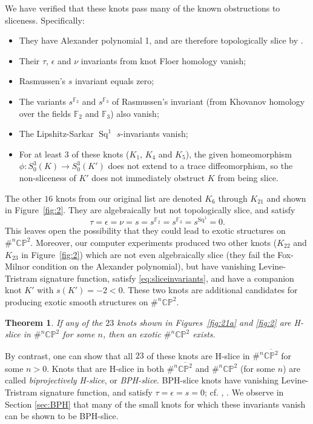 \documentclass [11pt]{amsart}
\newtheorem {theorem}{Theorem}[section]
\theoremstyle{remark}
\def\CP{\mathbb{CP}^2}
\def\bCP{\overline{\mathbb{CP}^2}}
\def\F{\mathbb{F}}
\begin{document}
We have verified that these knots pass many of the known obstructions to sliceness. Specifically:
\begin{itemize}
\item They have Alexander polynomial 1, and are therefore topologically slice by \cite{Freedman}. 
\item Their $\tau$, $\epsilon$ and $\nu$ invariants from knot Floer homology vanish;
\item Rasmussen's $s$ invariant equals zero;
\item The variants $s^{\F_2}$ and $s^{\F_3}$ of Rasmussen's invariant (from Khovanov homology over the fields $\F_2$ and $\F_3$) also vanish;
\item The Lipshitz-Sarkar $\operatorname{Sq}^1$ $s$-invariants vanish;
\item For at least $3$ of these knots ($K_1$, $K_4$ and $K_5$), the given homeomorphism $\phi: S^3_0(K) \to S^3_0(K')$ does not extend to a trace diffeomorphism, so the non-sliceness of $K'$ does not immediately obstruct $K$ from being slice. 
\end{itemize}

The other $16$ knots from our original list are denoted $K_6$ through $K_{21}$ and shown in Figure~\ref{fig:2}. They are algebraically but not topologically slice, and satisfy
\begin{equation}
\label{eq:sliceinvariants}
\tau=\epsilon=\nu=s=s^{\F_2}=s^{\F_3}=s^{\operatorname{Sq}^1} =0.
\end{equation}
This leaves open the possibility that they could lead to exotic structures on $\#^n \CP$. Moreover, our computer experiments produced two other knots ($K_{22}$ and $K_{23}$ in Figure~\ref{fig:2}) which are not even algebraically slice (they fail the Fox-Milnor condition on the Alexander polynomial), but have vanishing Levine-Tristram signature function, satisfy \eqref{eq:sliceinvariants}, and have a companion knot $K'$ with $s(K')=-2< 0$. These two knots are additional candidates for producing exotic smooth structures on $\#^n \CP$. 

\begin{theorem}
\label{thm:23}
If any of the $23$ knots shown in Figures~\ref{fig:21a} and \ref{fig:2} are H-slice in $\#^n \CP$ for some $n$, then an exotic $\#^n \CP$ exists.
\end{theorem}

By contrast, one can show that all $23$ of these knots are H-slice in $\#^n \bCP$ for some $n > 0$. Knots that are H-slice in both $\#^n \bCP$ and $\#^n \CP$ (for some $n$) are called \emph{biprojectively H-slice}, or \emph{BPH-slice}. BPH-slice knots have vanishing Levine-Tristram signature function, and satisfy $\tau=\epsilon=s=0$; cf. \cite{CochranHarveyHorn}, \cite{MMSW}. We observe in Section \ref{sec:BPH} that many of the small knots for which these invariants vanish can be shown to be BPH-slice. 
\end{document}
